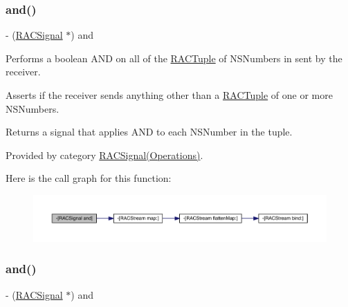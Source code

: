 \subsubsection{\texorpdfstring{and()}{and()}\hspace{0.1cm}{\footnotesize\ttfamily [1/3]}}
{\footnotesize\ttfamily -\/ (\mbox{\hyperlink{interface_r_a_c_signal}{R\+A\+C\+Signal}} $\ast$) and \begin{DoxyParamCaption}{ }\end{DoxyParamCaption}}

Performs a boolean A\+ND on all of the \mbox{\hyperlink{interface_r_a_c_tuple}{R\+A\+C\+Tuple}} of N\+S\+Numbers in sent by the receiver.

Asserts if the receiver sends anything other than a \mbox{\hyperlink{interface_r_a_c_tuple}{R\+A\+C\+Tuple}} of one or more N\+S\+Numbers.

Returns a signal that applies A\+ND to each N\+S\+Number in the tuple. 

Provided by category \mbox{\hyperlink{category_r_a_c_signal_07_operations_08_a4a12f1ef58487260894d1ef37dbb9c9d}{R\+A\+C\+Signal(\+Operations)}}.

Here is the call graph for this function\+:\nopagebreak
\begin{figure}[H]
\begin{center}
\leavevmode
\includegraphics[width=350pt]{interface_r_a_c_signal_a4a12f1ef58487260894d1ef37dbb9c9d_cgraph}
\end{center}
\end{figure}
\mbox{\label{interface_r_a_c_signal_a4a12f1ef58487260894d1ef37dbb9c9d}} 
\subsubsection{\texorpdfstring{and()}{and()}\hspace{0.1cm}{\footnotesize\ttfamily [2/3]}}
{\footnotesize\ttfamily -\/ (\mbox{\hyperlink{interface_r_a_c_signal}{R\+A\+C\+Signal}} $\ast$) and \begin{DoxyParamCaption}{ }\end{DoxyParamCaption}}

